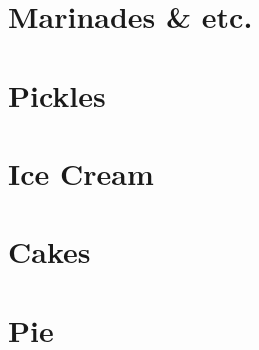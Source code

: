 \documentclass{family_cookbook}
\begin{document}
\chapter{Marinades \& etc.}
\minitoc%
\clearpage






\chapter{Pickles}
\minitoc%
\clearpage

{%
	\let\section\subsection%
	\let\subsection\subsubsection%
	
	
	
}


\chapter{Ice Cream}
\minitoc%
\clearpage



\chapter{Cakes}
\minitoc%
\clearpage









%





\chapter{Pie}
\minitoc%
\clearpage






\clearpage
{}
\printbibliography%

\clearpage
\printindex

\printglossary[type=\acronymtype]
\end{document}
